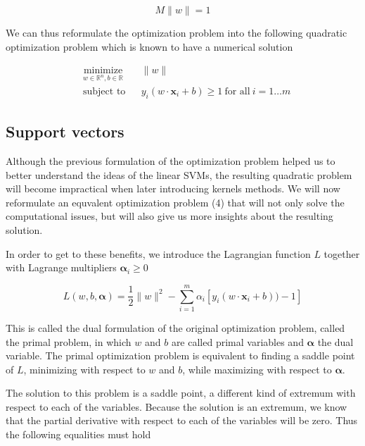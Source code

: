 \begin{equation*}
  M\|w\| = 1
\end{equation*}
  
We can thus reformulate the optimization problem into the following quadratic optimization problem which is known to have a numerical solution

\begin{equation}
  \begin{aligned}
    &\underset{w \in \mathbb{R}^n, b \in \mathbb{R}} {\text{minimize}}
    & &\|w\|\\
    &\text{subject to}
    & &y_i(w \cdot \mathbf{x}_i + b) \ge 1\ \text{for all}\ i = 1 \dotsc m
  \end{aligned}
\end{equation}

\subsection {Support vectors}

Although the previous formulation of the optimization problem helped us to better understand the ideas of the linear SVMs, the resulting quadratic problem will become impractical when later introducing kernels methods. We will now reformulate an equvalent optimization problem (4) that will not only solve the computational issues, but will also give us more insights about the resulting solution.

In order to get to these benefits, we introduce the Lagrangian function $L$ together with Lagrange multipliers $\boldsymbol{\alpha}_i \ge 0$

\begin{equation}
  L(w, b, \boldsymbol{\alpha}) = \frac{1}{2}\|w\|^2 - \sum^m_{i=1} \alpha_i[y_i(w \cdot \mathbf{x}_i + b)) - 1]
\end{equation}

This is called the dual formulation of the original optimization problem, called the primal problem, in which $w$ and $b$ are called primal variables and $\boldsymbol{\alpha}$ the dual variable. The primal optimization problem is equivalent to finding a saddle point of $L$, minimizing with respect to $w$ and $b$, while maximizing with respect to $\boldsymbol{\alpha}$.

The solution to this problem is a saddle point, a different kind of extremum with respect to each of the variables. Because the solution is an extremum, we know that the partial derivative with respect to each of the variables will be zero. Thus the following equalities must hold

